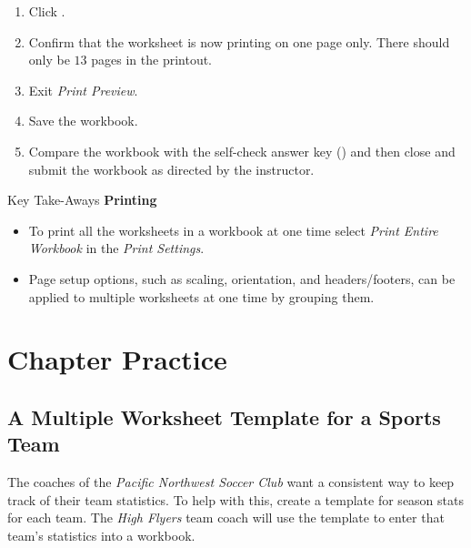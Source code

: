 \begin{enumerate}
	\item Click .
	\item Confirm that the  worksheet is now printing on one page only. There should only be $ 13 $ pages in the printout.
	\item Exit \textit{Print Preview}.
	\item Save the  workbook.
	\item Compare the workbook with the self-check answer key () and then close and submit the  workbook as directed by the instructor.

\end{enumerate}

\begin{center}
	\begin{tkwbox}{Key Take-Aways}
		\textbf{Printing}
		\\
		\begin{itemize}
			\setlength{\itemsep}{0pt}
			\setlength{\parskip}{0pt}
			\setlength{\parsep}{0pt}
			
			\item To print all the worksheets in a workbook at one time select \textit{Print Entire Workbook} in the \textit{Print Settings}.
			\item Page setup options, such as scaling, orientation, and headers/footers, can be applied to multiple worksheets at one time by grouping them.
			
		\end{itemize}
	\end{tkwbox}
\end{center}

\section{Chapter Practice}

\subsection{A Multiple Worksheet Template for a Sports Team}

The coaches of the \textit{Pacific Northwest Soccer Club} want a consistent way to keep track of their team statistics. To help with this, create a template for season stats for each team. The \textit{High Flyers} team coach will use the template to enter that team's statistics into a workbook.

